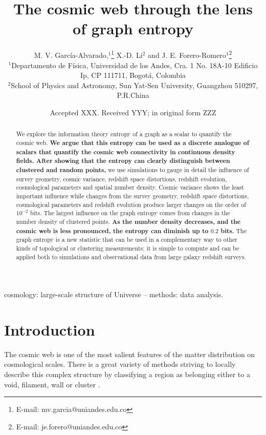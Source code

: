 \documentclass[fleqn,usenatbib]{mnras}
\title[Cosmic Web Graph Entropy]{The cosmic web through the lens of graph entropy}
\author[Garc\'ia-Alvarado et al.]{
M. V. Garc\'ia-Alvarado,$^{1}$\thanks{E-mail: mv.garcia@uniandes.edu.co}
X.-D. Li$^{2}$
and J. E. Forero-Romero$^{1}$\thanks{E-mail: je.forero@uniandes.edu.co}
\\
$^{1}$Departamento de F\'isica, Universidad de los Andes, Cra. 1 No. 18A-10 Edificio Ip, CP 111711, Bogot\'a, Colombia\\
$^{2}$School of Physics and Astronomy, Sun Yat-Sen University, Guangzhou 510297, P.R.China\\
}
\date{Accepted XXX. Received YYY; in original form ZZZ}
\begin{document}
\label{firstpage}
\pagerange{\pageref{firstpage}--\pageref{lastpage}}
\maketitle

\begin{abstract}
  We explore the information theory entropy of a graph as a scalar to
  quantify the cosmic web. 
  \textbf{We argue that this entropy can be
  used as a discrete analogue of scalars that quantify the cosmic web connectivity in continuous density fields. 
 After showing that the entropy can clearly distinguish between clustered and random points, }
  we use simulations to gauge in detail the influence of survey geometry, cosmic variance, 
  redshift space distortions, redshift evolution, cosmological parameters and 
  spatial number density.  
  Cosmic variance shows the least important influence while
  changes from the survey geometry, redshift space distortions, cosmological 
  parameters and redshift evolution produce larger changes on the
  order of $10^{-2}$ bits.
  The largest influence on the graph entropy comes from changes in the 
  number density of clustered points.
  \textbf{As the number density decreases, and the cosmic web is less pronounced, the entropy can diminish up to $0.2$ bits.}
 The graph entropy is a new statistic that can be used in a complementary way to other kinds of topological or clustering measurements; it is simple to compute and can be applied both to simulations and observational data from large galaxy redshift surveys.
\end{abstract}
\begin{keywords}
cosmology: large-scale structure of Universe -- methods: data analysis.
\end{keywords}


\section{Introduction}

The cosmic web is one of the most salient features of the matter distribution
on cosmological scales. 
There is a great variety of methods striving to locally describe this complex 
structure by classifying a region as belonging either
to a void, filament, wall or cluster \citep{2018MNRAS.473.1195L}. 
\end{document}
